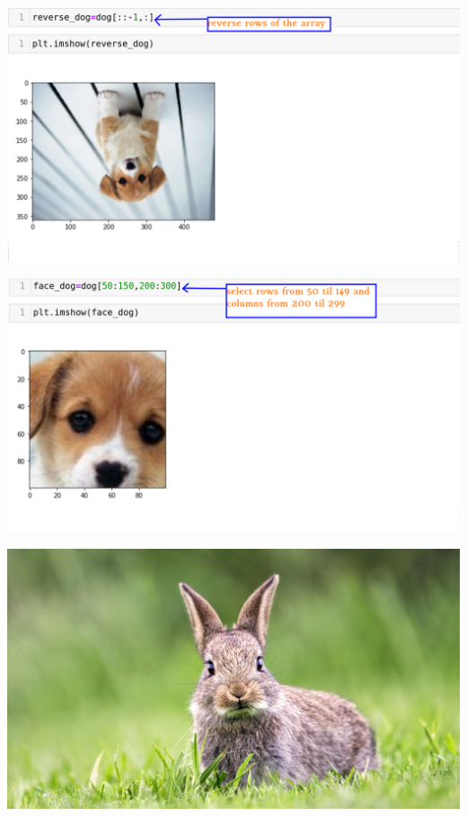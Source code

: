 \documentclass[12pt,aspectratio=169]{beamer}
\begin{document}
\begin{frame}
\begin{center}
\includegraphics[scale=0.5]{dog7}
\end{center}
\end{frame}

\begin{frame}
\begin{center}
\includegraphics[scale=0.5]{dog8}
\end{center}
\end{frame}



\begin{frame}
\begin{center}
\includegraphics[scale=0.1]{rabbit}
\end{center}
\end{frame}
\end{document}
